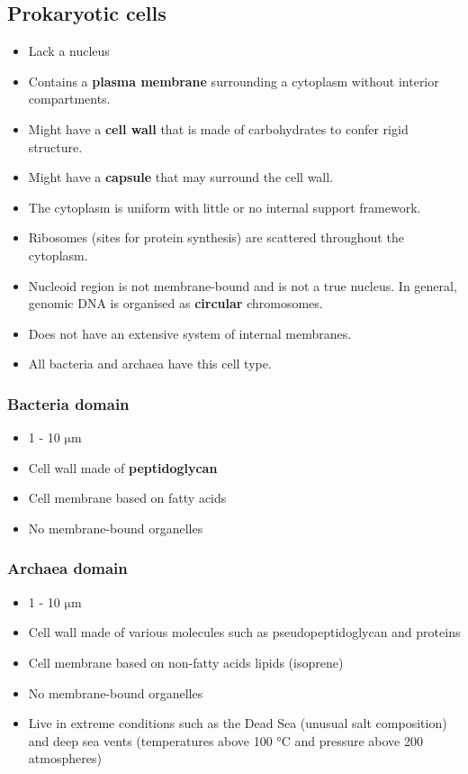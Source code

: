 \documentclass[11pt]{article}
\begin{document}
\subsection{Prokaryotic cells}
\label{sec:orgf4143e4}
\begin{itemize}
\item Lack a nucleus
\item Contains a \textbf{plasma membrane} surrounding a cytoplasm without interior compartments.
\item Might have a \textbf{cell wall} that is made of carbohydrates to confer rigid structure.
\item Might have a \textbf{capsule} that may surround the cell wall.
\item The cytoplasm is uniform with little or no internal support framework.
\item Ribosomes (sites for protein synthesis) are scattered throughout the cytoplasm.
\item Nucleoid region is not membrane-bound and is not a true nucleus. In general, genomic DNA is organised as \textbf{circular} chromosomes.
\item Does not have an extensive system of internal membranes.
\item All bacteria and archaea have this cell type.
\end{itemize}

\subsubsection{Bacteria domain}
\label{sec:orgeb8f142}
\begin{itemize}
\item 1 - 10 \(\unit{\micro\metre}\)
\item Cell wall made of \textbf{peptidoglycan}
\item Cell membrane based on fatty acids
\item No membrane-bound organelles
\end{itemize}

\newpage

\subsubsection{Archaea domain}
\label{sec:org57a04e9}
\begin{itemize}
\item 1 - 10 \(\unit{\micro\metre}\)
\item Cell wall made of various molecules such as pseudopeptidoglycan and proteins
\item Cell membrane based on non-fatty acids lipids (isoprene)
\item No membrane-bound organelles
\item Live in extreme conditions such as the Dead Sea (unusual salt composition) and deep sea vents (temperatures above 100 \(\unit{\degreeCelsius}\) and pressure above 200 atmospheres)
\end{itemize}
\end{document}
